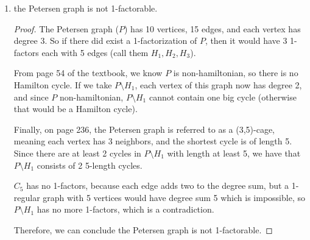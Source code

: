 \documentclass[11pt]{article}
\newcommand{\n}{\vspace{0.3cm}}
\begin{document}
\begin{itemize}
\begin{enumerate}[label=(\alph*)]
\begin{enumerate}[label=(\roman*)]
\begin{itemize}
\begin{proof}
                  Obviously if \(i=j\) then \(2i = 2j\), so \(2i \equiv 2j \pmod{2n-1}\).  Now if \(2i \equiv 2j \pmod{2n-1}\), then \(i \equiv 2^{-1} \cdot 2i \equiv 2^{-1} \cdot 2j \equiv j \pmod{2n-1}\).  Since \(0 \leq i,j < 2n-1\), we can conclude that \(i = j\).  So all these matchings are unique. \n

                  for each \(i, \; 0 \leq i < 2n-1\), we have that \((i-1)+(i+1) \equiv (i-2)+(i+2) \equiv \hdots \equiv (i-(n-1))+(i-(n-1)) \equiv 2i \pmod{2n-1}\), so for each matching, we have \(n-1 \;\; y_jy_k\) edges, adding our \(xy_i\) edge, we have \(n\) edges for each matching, this gives us the desired matching size, so we can conclude this formulation yields a 1-factorization.
                \end{proof}
                
                
            \end{itemize}
          \item the Petersen graph is not 1-factorable.
            \begin{proof}
              The Petersen graph (\(P\)) has 10 vertices, 15 edges, and each vertex has degree 3.  So if there did exist a 1-factorization  of \(P\), then it would have 3 1-factors each with 5 edges (call them \(H_1,H_2,H_3\)).  \n

              From page 54 of the textbook, we know \(P\) is non-hamiltonian, so there is no Hamilton cycle. If we take \(P \setminus H_1\), each vertex of this graph now has degree 2, and since \(P\) non-hamiltonian, \(P \setminus H_1\) cannot contain one big cycle (otherwise that would be a Hamilton cycle). \n

              Finally, on page 236, the Petersen graph is referred to as a (3,5)-cage, meaning each vertex has 3 neighbors, and the shortest cycle is of length 5.  Since there are at least 2 cycles in \(P \setminus H_1\) with length at least 5, we have that \(P \setminus H_1\) consists of 2 5-length cycles. \n

              \(C_5\) has no 1-factors, because each edge adds two to the degree sum, but a 1-regular graph with 5 vertices would have degree sum 5 which is impossible, so \(P \setminus H_1\) has no more 1-factors, which is a contradiction. \n

              Therefore, we can conclude the Petersen graph is not 1-factorable.
            \end{proof}
            
        \end{enumerate}
    \end{enumerate}



\end{itemize}
\end{document}
